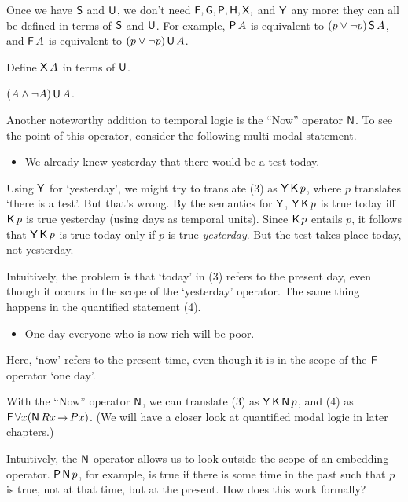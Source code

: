Once we have $\operatorname{\mathsf{S}}$ and $\operatorname{\mathsf{U}}$, we don't need $\operatorname{\mathsf{F}}, \operatorname{\mathsf{G}},\operatorname{\mathsf{P}},\operatorname{\mathsf{H}},\operatorname{\mathsf{X}},$ and $\operatorname{\mathsf{Y}}$ any more: they can all be defined in terms of $\operatorname{\mathsf{S}}$ and
$\operatorname{\mathsf{U}}$. For example, $\operatorname{\mathsf{P}} A$ is equivalent to $(p\lor \neg p)\operatorname{\mathsf{S}} A$, and $\operatorname{\mathsf{F}} A$
is equivalent to $(p \lor \neg p)\operatorname{\mathsf{U}} A$.

\begin{exercise}
  Define $\operatorname{\mathsf{X}} A$ in terms of $\operatorname{\mathsf{U}}$.
\end{exercise}
\begin{solution}
  $(A \land \neg A) \operatorname{\mathsf{U}} A$.
\end{solution}

Another noteworthy addition to temporal logic is the ``Now'' operator $\operatorname{\mathsf{N}}$.
To see the point of this operator, consider the following multi-modal statement.

\begin{itemize}[leftmargin=10mm]
  \itemsep-1mm
\item[(3)] We already knew yesterday that there would be a test today.
\end{itemize}

Using $\operatorname{\mathsf{Y}}$ for `yesterday', we might try to translate (3) as $\operatorname{\mathsf{Y}} \operatorname{\mathsf{K}{}} p$, where
$p$ translates `there is a test'. But that's wrong. By the semantics for $\operatorname{\mathsf{Y}}$,
$\operatorname{\mathsf{Y}} \operatorname{\mathsf{K}{}} p$ is true today iff $\operatorname{\mathsf{K}{}} p$ is true yesterday (using days as temporal
units). Since $\operatorname{\mathsf{K}{}} p$ entails $p$, it follows that $\operatorname{\mathsf{Y}} \operatorname{\mathsf{K}{}} p$ is true today
only if $p$ is true \emph{yesterday}. But the test takes place today, not
yesterday.

Intuitively, the problem is that `today' in (3) refers to the present day, even
though it occurs in the scope of the `yesterday' operator. The same thing
happens in the quantified statement (4).
%
\begin{itemize}[leftmargin=10mm]
  \itemsep-1mm
\item[(4)] One day everyone who is now rich will be poor.
\end{itemize}
% 
Here, `now' refers to the present time, even though it is in the scope
of the $\operatorname{\mathsf{F}}$ operator `one day'.


With the ``Now'' operator $\operatorname{\mathsf{N}}$, we can translate (3) as $\operatorname{\mathsf{Y}} \operatorname{\mathsf{K}{}} \operatorname{\mathsf{N}} p$, and
(4) as $\tF \forall x (\tN Rx \to Px)$. (We will have a closer look at
quantified modal logic in later chapters.)

Intuitively, the $\operatorname{\mathsf{N}}$ operator allows us to look outside the scope of an
embedding operator. $\operatorname{\mathsf{P}} \operatorname{\mathsf{N}} p$, for example, is true if there is some time in
the past such that $p$ is true, not at that time, but at the present. How
does this work formally?

